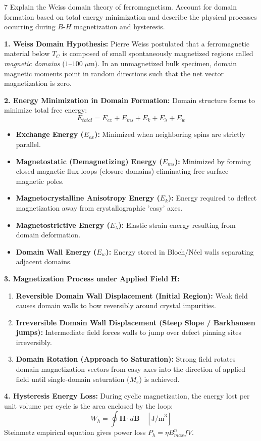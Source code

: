 \begin{theoryq}{7}
Explain the Weiss domain theory of ferromagnetism. Account for domain formation based on total energy minimization and describe the physical processes occurring during $B$-$H$ magnetization and hysteresis.
\end{theoryq}
\begin{theorysol}
\textbf{1. Weiss Domain Hypothesis:}
Pierre Weiss postulated that a ferromagnetic material below $T_C$ is composed of small spontaneously magnetized regions called \textit{magnetic domains} ($1\text{--}100\;\mu\text{m}$). In an unmagnetized bulk specimen, domain magnetic moments point in random directions such that the net vector magnetization is zero.

\textbf{2. Energy Minimization in Domain Formation:}
Domain structure forms to minimize total free energy:
\begin{equation}
E_{total} = E_{ex} + E_{ms} + E_k + E_\lambda + E_w
\end{equation}
\begin{itemize}
\item \textbf{Exchange Energy ($E_{ex}$):} Minimized when neighboring spins are strictly parallel.
\item \textbf{Magnetostatic (Demagnetizing) Energy ($E_{ms}$):} Minimized by forming closed magnetic flux loops (closure domains) eliminating free surface magnetic poles.
\item \textbf{Magnetocrystalline Anisotropy Energy ($E_k$):} Energy required to deflect magnetization away from crystallographic 'easy' axes.
\item \textbf{Magnetostrictive Energy ($E_\lambda$):} Elastic strain energy resulting from domain deformation.
\item \textbf{Domain Wall Energy ($E_w$):} Energy stored in Bloch/Néel walls separating adjacent domains.
\end{itemize}

\textbf{3. Magnetization Process under Applied Field $\mathbf{H}$:}
\begin{enumerate}
\item \textbf{Reversible Domain Wall Displacement (Initial Region):} Weak field causes domain walls to bow reversibly around crystal impurities.
\item \textbf{Irreversible Domain Wall Displacement (Steep Slope / Barkhausen jumps):} Intermediate field forces walls to jump over defect pinning sites irreversibly.
\item \textbf{Domain Rotation (Approach to Saturation):} Strong field rotates domain magnetization vectors from easy axes into the direction of applied field until single-domain saturation ($M_s$) is achieved.
\end{enumerate}

\textbf{4. Hysteresis Energy Loss:}
During cyclic magnetization, the energy lost per unit volume per cycle is the area enclosed by the loop:
\begin{equation}
W_h = \oint \mathbf{H} \cdot d\mathbf{B}\quad [\text{J/m}^3]
\end{equation}
Steinmetz empirical equation gives power loss $P_h = \eta B_{max}^n f V$.
\end{theorysol}
